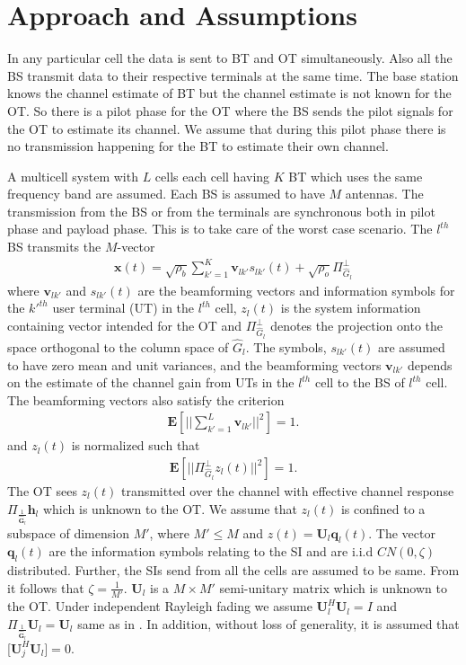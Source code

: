 \documentclass[10pt, a4paper, twoside,fleqn]{article}
\begin{document}
\section{Approach and Assumptions}	
	In any particular cell the data is sent to BT and OT simultaneously. Also all the BS transmit data to their respective terminals at the same time. The base station knows the channel estimate of BT but the channel estimate is not known for the OT. So there is a pilot phase for the OT where the BS sends the pilot signals for the OT to estimate its channel. We assume that during this pilot phase there is no transmission happening for the BT to estimate their own channel.

	A multicell system with $L$ cells each cell having $K$ BT which uses the same frequency band are assumed. Each BS is assumed to have $M$ antennas. The transmission from the BS or from the terminals are synchronous both in pilot phase and payload phase. This is to take care of the worst case scenario. The $l^{th}$ BS transmits the $M$-vector
\begin{eqnarray}
	\pmb{x}(t) = \sqrt{\rho_b}\sum\limits_{k'=1}^{K}\boldsymbol{v}_{lk'}s_{lk'}(t)
    		      + \sqrt{\rho_o}\Pi^{\perp}_{{\widehat{G}_l}}
\end{eqnarray}
where $\pmb{v}_{lk'}$ and $s_{lk'}(t)$ are the beamforming vectors and information symbols for the $k'^{th}$ user terminal (UT) in the $l^{th}$ cell, $z_l(t)$ is the system information containing vector intended for the OT and $\Pi^{\perp}_{{\widehat{G}_l}}$ denotes the projection onto the space orthogonal to the column space of $\hat G_l$. The symbols, $s_{lk'}(t)$ are assumed to have zero mean and unit variances, and the beamforming vectors $\pmb{v}_{lk'}$ depends on the estimate of the channel gain from UTs in the $l^{th}$ cell to the BS of $l^{th}$ cell. 
The beamforming vectors also satisfy the criterion
\begin{eqnarray}
	\pmb{E}\left[||\sum\limits_{k'=1}^{L}\pmb{v}_{lk'}||^2\right]=1.
\end{eqnarray}
and $z_l(t)$ is normalized such that
\begin{eqnarray}\label{eqn:zlcondition}
	\pmb{E}\left[||\Pi^{\perp}_{{\widehat{G}_l}}z_l(t)||^2\right]=1.
\end{eqnarray}
The OT sees $z_l(t)$ transmitted over the channel with effective channel response $\Pi_{\frac{1}{\pmb{\hat G}_l}}\pmb{h}_l$ which is unknown to the OT. We assume that $z_l(t)$ is confined to a subspace of dimension $M'$, where $M'\leq M$ and $z(t) = \pmb{U}_l\pmb{q}_l(t)$. The vector $\pmb{q}_l(t)$ are the information symbols relating to the SI and are i.i.d $CN(0,\zeta)$ distributed. Further, the SIs send from all the cells are assumed to be same. From \cite{bib:jbb} it follows that $\zeta=\frac{1}{M'}$. $\pmb{U}_l$ is a $M\times M'$ semi-unitary matrix which is unknown to the OT. Under independent Rayleigh fading we assume $\pmb{U}_l^H\pmb{U}_l=I$ and $\Pi_{\frac{1}{\pmb{\hat G}_l}}\pmb{U}_l=\pmb{U}_l$ same as in \cite{bib:jbb}. In addition, without loss of generality, it is assumed that [$\pmb{U}_j^H\pmb{U}_l]=0$.
\end{document}
